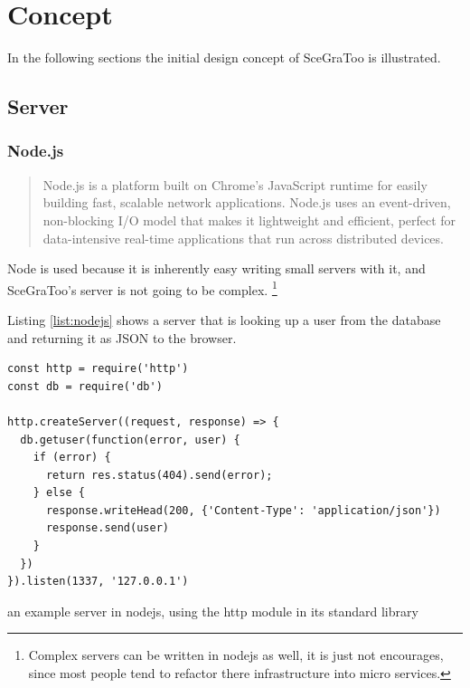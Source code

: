 
\section{Concept}
\label{concept}


In the following sections the initial design concept of SceGraToo is illustrated.

\subsection{Server}
\label{server}

\subsubsection{Node.js}
\begin{quote}
  Node.js is a platform built on Chrome's JavaScript runtime for easily building fast, scalable network applications. Node.js uses an event-driven, non-blocking I/O model that makes it lightweight and efficient, perfect for data-intensive real-time applications that run across distributed devices. \cite{nodejs}
\end{quote}

Node is used because it is inherently easy writing small servers with it, and
SceGraToo's server is not going to be complex. \footnote{Complex servers can be
written in nodejs as well, it is just not encourages, since most people tend to
refactor there infrastructure into micro services.}

Listing \ref{list:nodejs} shows a server that is looking up a user from the database and returning it as JSON to the browser.

\begin{listing}
  \begin{verbatim}
const http = require('http')
const db = require('db')

http.createServer((request, response) => {
  db.getuser(function(error, user) {
    if (error) {
      return res.status(404).send(error);
    } else {
      response.writeHead(200, {'Content-Type': 'application/json'})
      response.send(user)
    }
  })
}).listen(1337, '127.0.0.1')
  \end{verbatim}
  \caption{an example server in nodejs, using the http module in its standard library}
  \label{list:nodejs}
\end{listing}

